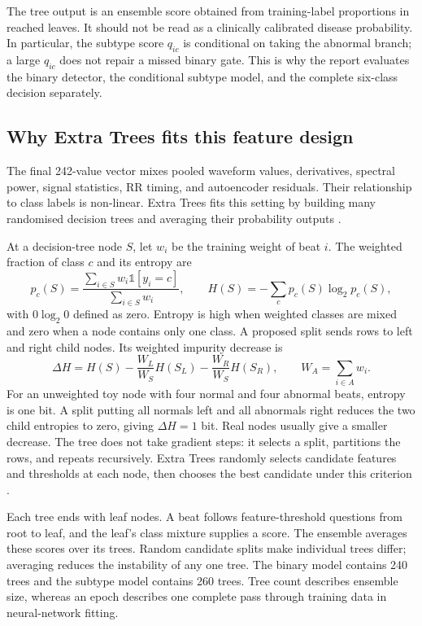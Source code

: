 The tree output is an ensemble score obtained from training-label proportions
in reached leaves. It should not be read as a clinically calibrated disease
probability. In particular, the subtype score $q_{ic}$ is conditional on
taking the abnormal branch; a large $q_{ic}$ does not repair a missed binary
gate. This is why the report evaluates the binary detector, the conditional
subtype model, and the complete six-class decision separately.

\subsection{Why Extra Trees fits this feature design}

The final 242-value vector mixes pooled waveform values, derivatives, spectral
power, signal statistics, RR timing, and autoencoder residuals. Their
relationship to class labels is non-linear. Extra Trees fits this setting by
building many randomised decision trees and averaging their probability
outputs \cite{geurts2006extratrees}.

At a decision-tree node $S$, let $w_i$ be the training weight of beat $i$.
The weighted fraction of class $c$ and its entropy are
\begin{equation}
 p_c(S)=\frac{\sum_{i\in S}w_i\mathbb{1}[y_i=c]}
 {\sum_{i\in S}w_i},\qquad
 H(S)=-\sum_c p_c(S)\log_2 p_c(S),
 \label{eq:theory-weighted-entropy}
\end{equation}
with $0\log_2 0$ defined as zero. Entropy is high when weighted classes are
mixed and zero when a node contains only one class. A proposed split sends
rows to left and right child nodes. Its weighted impurity decrease is
\begin{equation}
 \Delta H=H(S)-\frac{W_L}{W_S}H(S_L)
                 -\frac{W_R}{W_S}H(S_R),
 \qquad W_A=\sum_{i\in A}w_i.
 \label{eq:theory-information-gain}
\end{equation}
For an unweighted toy node with four normal and four abnormal beats, entropy
is one bit. A split putting all normals left and all abnormals right reduces
the two child entropies to zero, giving $\Delta H=1$ bit. Real nodes usually
give a smaller decrease. The tree does not take gradient steps: it selects a
split, partitions the rows, and repeats recursively. Extra Trees randomly
selects candidate features and thresholds at each node, then chooses the
best candidate under this criterion \cite{geurts2006extratrees}.

Each tree ends with leaf nodes. A beat follows feature-threshold questions
from root to leaf, and the leaf's class mixture supplies a score. The ensemble
averages these scores over its trees. Random candidate splits make individual
trees differ; averaging reduces the instability of any one tree. The binary model contains 240 trees and the subtype model contains 260 trees.
Tree count describes ensemble size, whereas an epoch describes one complete
pass through training data in neural-network fitting.

